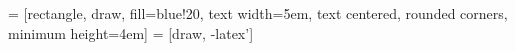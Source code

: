 \documentclass[11pt,a4paper]{report}
\begin{document}
 
	\sloppy
	
	\setcounter{tocdepth}{4} %
	
	
	
	
	
	
	
	 = [rectangle, draw, fill=blue!20, 
	text width=5em, text centered, rounded corners, minimum height=4em]
	 = [draw, -latex']
	
	
	
	
	
	
	
	\tableofcontents
	\listoftables
	\listoffigures
	  
	
	
	
	
	
	
	
	
	
	
\end{document}
